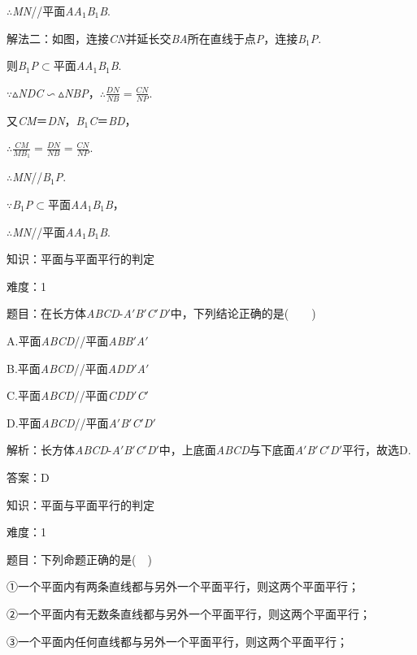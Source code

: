 \documentclass{article} %
\begin{document}
$\mathrm{\therefore}$\textit{MN}//平面\textit{AA}${}_{1}$\textit{B}${}_{1}$\textit{B}.

解法二：如图，连接\textit{CN}并延长交\textit{BA}所在直线于点\textit{P}，连接\textit{B}${}_{1}$\textit{P}.

则\textit{B}${}_{1}$\textit{P}$\mathrm{\subset }$平面\textit{AA}${}_{1}$\textit{B}${}_{1}$\textit{B}.

$\mathrm{\because}$$\mathrm{\vartriangle}$\textit{NDC}$\mathrm{\backsim}$$\mathrm{\vartriangle}$\textit{NBP}，$\mathrm{\therefore}\frac{DN}{NB}=\frac{CN}{NP}$.

又\textit{CM}＝\textit{DN}，\textit{B}${}_{1}$\textit{C}＝\textit{BD}，

$\mathrm{\therefore}\frac{CM}{MB_1}=\frac{DN}{NB}=\frac{CN}{NP}$.

$\mathrm{\therefore}$\textit{MN}//\textit{B}${}_{1}$\textit{P}.

$\mathrm{\because}$\textit{B}${}_{1}$\textit{P}$\mathrm{\subset }$平面\textit{AA}${}_{1}$\textit{B}${}_{1}$\textit{B}，

$\mathrm{\therefore}$\textit{MN}//平面\textit{AA}${}_{1}$\textit{B}${}_{1}$\textit{B}.


知识：平面与平面平行的判定

难度：1

题目：在长方体\textit{ABCD}-\textit{A}$'$\textit{B}$'$\textit{C}$'$\textit{D}$'$中，下列结论正确的是(　　)

A.平面\textit{ABCD}//平面\textit{ABB}$'$\textit{A}$'$

B.平面\textit{ABCD}//平面\textit{ADD}$'$\textit{A}$'$

C.平面\textit{ABCD}//平面\textit{CDD}$'$\textit{C}$'$

D.平面\textit{ABCD}//平面\textit{A}$'$\textit{B}$'$\textit{C}$'$\textit{D}$'$

解析：长方体\textit{ABCD}-\textit{A}$'$\textit{B}$'$\textit{C}$'$\textit{D}$'$中，上底面\textit{ABCD}与下底面\textit{A}$'$\textit{B}$'$\textit{C}$'$\textit{D}$'$平行，故选D.

答案：D

知识：平面与平面平行的判定

难度：1

题目：下列命题正确的是(　)

①一个平面内有两条直线都与另外一个平面平行，则这两个平面平行；

②一个平面内有无数条直线都与另外一个平面平行，则这两个平面平行；

③一个平面内任何直线都与另外一个平面平行，则这两个平面平行；
\end{document}
